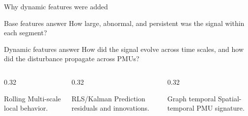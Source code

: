 \documentclass[10pt,aspectratio=169]{beamer}
\begin{document}
\begin{frame}{Why dynamic features were added}
\small
\begin{block}{Base features answer}
How large, abnormal, and persistent was the signal within each segment?
\end{block}
\begin{alertblock}{Dynamic features answer}
How did the signal evolve across time scales, and how did the disturbance propagate across PMUs?
\end{alertblock}
\begin{columns}[T,totalwidth=\textwidth]
\begin{column}{0.32\textwidth}
\begin{exampleblock}{Rolling}
Multi-scale local behavior.
\end{exampleblock}
\end{column}
\begin{column}{0.32\textwidth}
\begin{exampleblock}{RLS/Kalman}
Prediction residuals and innovations.
\end{exampleblock}
\end{column}
\begin{column}{0.32\textwidth}
\begin{exampleblock}{Graph temporal}
Spatial-temporal PMU signature.
\end{exampleblock}
\end{column}
\end{columns}
\end{frame}
\end{document}
